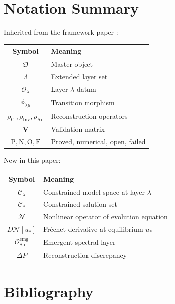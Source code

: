 \documentclass[11pt,a4paper]{article}
\theoremstyle{definition}
\theoremstyle{plain}
\newcommand{\Lam}{\Lambda}
\newcommand{\Sp}{\mathrm{Sp}}
\newcommand{\Cl}{\mathrm{Cl}}
\newcommand{\Inv}{\mathrm{Inv}}
\newcommand{\An}{\mathrm{An}}
\newcommand{\Ob}{\mathfrak{O}}
\newcommand{\Ocal}{\mathcal{O}}
\newcommand{\Ccal}{\mathcal{C}}
\newcommand{\Ncal}{\mathcal{N}}
\newcommand{\philam}{\phi_{\lambda\mu}}
\newcommand{\Vmat}{\mathbf{V}}
\newcommand{\Pmark}{\mathrm{P}}
\newcommand{\Nmark}{\mathrm{N}}
\newcommand{\Omark}{\mathrm{O}}
\newcommand{\Fmark}{\mathrm{F}}
\begin{document}
\appendix

\section{Notation Summary}
\label{app:notation}

Inherited from the framework paper \cite{framework}:
\begin{center}
\begin{tabular}{c l}
  \toprule
  Symbol & Meaning \\
  \midrule
  $\Ob$ & Master object \\
  $\Lam$ & Extended layer set \\
  $\Ocal_\lambda$ & Layer-$\lambda$ datum \\
  $\philam$ & Transition morphism \\
  $\rho_\Cl, \rho_\Inv, \rho_\An$ & Reconstruction operators \\
  $\Vmat$ & Validation matrix \\
  $\Pmark, \Nmark, \Omark, \Fmark$ & Proved, numerical, open, failed \\
  \bottomrule
\end{tabular}
\end{center}

New in this paper:
\begin{center}
\begin{tabular}{c l}
  \toprule
  Symbol & Meaning \\
  \midrule
  $\Ccal_\lambda$ & Constrained model space at layer $\lambda$ \\
  $\Ccal_\ast$ & Constrained solution set \\
  $\Ncal$ & Nonlinear operator of evolution equation \\
  $D\Ncal[u_\ast]$ & Fr\'echet derivative at equilibrium $u_\ast$ \\
  $\Ocal_\Sp^{\mathrm{emg}}$ & Emergent spectral layer \\
  $\Delta P$ & Reconstruction discrepancy \\
  \bottomrule
\end{tabular}
\end{center}

\section{Bibliography}
\label{app:biblio}
\end{document}
